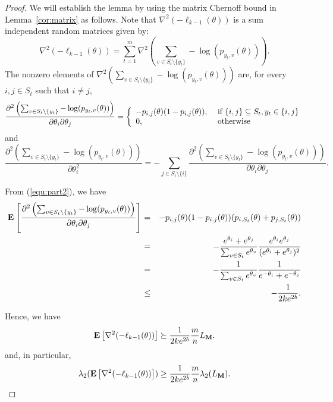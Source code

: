 \begin{proof} We will establish the lemma by using the matrix Chernoff bound in Lemma~\ref{cor:matrix} as follows. Note that $\nabla^2(-\ell_{k-1}(\theta))$ is a sum independent random matrices given by: 
$$
\nabla^2(-\ell_{k-1}(\theta)) = \sum_{t=1}^m \nabla^2 \left(\sum_{v\in S_t\setminus \{y_t\}}-\log(p_{y_t,v}(\theta))\right). 
$$ 
The nonzero elements of $\nabla^2 \left(\sum_{v\in S_t\setminus \{y_t\}}-\log(p_{y_t,v}(\theta))\right)$ are, for every $i,j \in S_t$ such that $i\neq j$,
\begin{equation}
\frac{\partial^2\left(\sum_{v\in S_t\setminus \{y_t\}} -\log(p_{y_t,v}(\theta))\right)}{\partial \theta_i \partial \theta_j}
= \left\{
\begin{array}{ll}
-p_{i,j}(\theta)(1-p_{i,j}(\theta)), & \hbox{ if } {\{i,j\}\subseteq S_t, y_t \in \{i,j\}}\\ 
0, & \hbox{ otherwise}
\end{array}
\right .
\label{equ:part2}
\end{equation}
and
$$
\frac{\partial^2\left(\sum_{v\in S_t\setminus \{y_t\}} -\log(p_{y_t,v}(\theta))\right)}{\partial \theta_i^2} = -\sum_{j\in S_t\setminus \{i\}} \frac{\partial^2\left(\sum_{v\in S_t\setminus \{y_t\}} -\log(p_{y_t,v}(\theta))\right)}{\partial \theta_i \partial \theta_j}.
$$

From (\ref{equ:part2}), we have
\begin{eqnarray}
\mathbf{E}\left[ \frac{\partial^2 \left(\sum_{v\in S_t\setminus \{y_t\}}-\log(p_{y_t,v}(\theta))\right)}{\partial \theta_i \partial \theta_j}\right] 
&=& -p_{i,j}(\theta)(1-p_{i,j}(\theta))(p_{i,S_t}(\theta) + p_{j,S_t}(\theta))\nonumber\\
&=& -\frac{e^{\theta_i}+e^{\theta_j}}{\sum_{v\in S_t}e^{\theta_v}}\frac{e^{\theta_i}e^{\theta_j}}{(e^{\theta_i}+e^{\theta_j})^2}\nonumber\\
&=& -\frac{1}{\sum_{v\in S_t}e^{\theta_v}}\frac{1}{e^{-\theta_i}+e^{-\theta_j}}\nonumber\\
&\leq & -\frac{1}{2ke^{2b}}.\nonumber 
\label{eq:k-ex} 
\end{eqnarray}

Hence, we have
$$
\mathbf{E}\left[ \nabla^2(-\ell_{k-1}(\theta))\right] \succeq \frac{1}{2ke^{2b}}\frac{m}{n} L_\mathbf{M}. 
$$
and, in particular,
\begin{equation}
\lambda_2(\mathbf{E}\left[ \nabla^2(-\ell_{k-1}(\theta))\right]) \geq \frac{1}{2ke^{2b}}\frac{m}{n} \lambda_2(L_\mathbf{M}). 
\label{eq:k-ex2}
\end{equation}


\end{proof}
